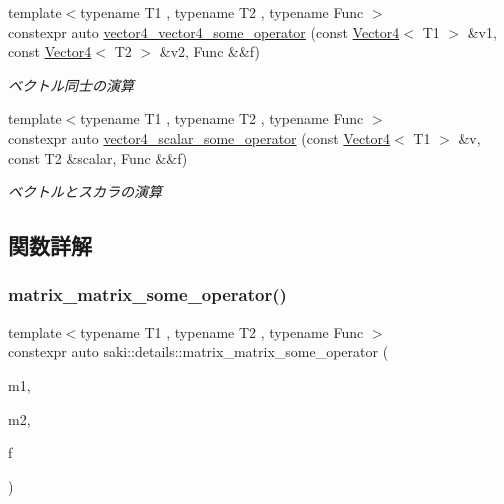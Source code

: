\begin{DoxyCompactItemize}
{\footnotesize template$<$typename T1 , typename T2 , typename Func $>$ }\\constexpr auto \mbox{\hyperlink{namespacesaki_1_1details_a7faa5e95c73949e48acc6840c357990f}{vector4\+\_\+vector4\+\_\+some\+\_\+operator}} (const \mbox{\hyperlink{classsaki_1_1_vector4}{Vector4}}$<$ T1 $>$ \&v1, const \mbox{\hyperlink{classsaki_1_1_vector4}{Vector4}}$<$ T2 $>$ \&v2, Func \&\&f)
\begin{DoxyCompactList}\small\item\em ベクトル同士の演算 \end{DoxyCompactList}\item 
{\footnotesize template$<$typename T1 , typename T2 , typename Func $>$ }\\constexpr auto \mbox{\hyperlink{namespacesaki_1_1details_a1786beb40b0c29d0e6ea19ce2aad110c}{vector4\+\_\+scalar\+\_\+some\+\_\+operator}} (const \mbox{\hyperlink{classsaki_1_1_vector4}{Vector4}}$<$ T1 $>$ \&v, const T2 \&scalar, Func \&\&f)
\begin{DoxyCompactList}\small\item\em ベクトルとスカラの演算 \end{DoxyCompactList}\end{DoxyCompactItemize}


\subsection{関数詳解}
\mbox{\label{namespacesaki_1_1details_a7aec6dfaff24ce512bf938a30e01339a}} 
\subsubsection{\texorpdfstring{matrix\+\_\+matrix\+\_\+some\+\_\+operator()}{matrix\_matrix\_some\_operator()}}
{\footnotesize\ttfamily template$<$typename T1 , typename T2 , typename Func $>$ \\
constexpr auto saki\+::details\+::matrix\+\_\+matrix\+\_\+some\+\_\+operator (\begin{DoxyParamCaption}\item[{const \mbox{\hyperlink{classsaki_1_1_matrix}{Matrix}}$<$ T1 $>$ \&}]{m1,  }\item[{const \mbox{\hyperlink{classsaki_1_1_matrix}{Matrix}}$<$ T2 $>$ \&}]{m2,  }\item[{const Func \&}]{f }\end{DoxyParamCaption})}



